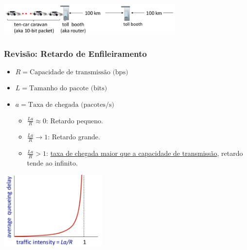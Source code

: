 \begin{itemize}[left=0.5cm, align=left, nosep]
            \begin{center}
                \includegraphics[width=0.7\textwidth]{img/cap-01/carro-pedagio.png}
            \end{center}

        \end{itemize}

    \subsubsection*{Revisão: Retardo de Enfileiramento}
        \begin{itemize}[left=0.5cm, align=left, nosep]
            \item $R = \text{Capacidade de transmissão (bps)}$ 
            \item $L = \text{Tamanho do pacote (bits)}$ 
            \item $a = \text{Taxa de chegada (pacotes/s)}$
            \begin{itemize}[left=0.5cm, nosep, label=$\hookrightarrow$]
                \item $\frac{La}{R} \approx 0$: Retardo pequeno.
                \item $\frac{La}{R} \rightarrow 1$: Retardo grande.
                \item $\frac{La}{R} > 1$: \underline{taxa de chegada maior que a capacidade de transmissão}, retardo tende ao infinito.
            \end{itemize}
        \end{itemize}
        
        \begin{center}
            \includegraphics[width=0.4\textwidth]{img/cap-01/retardo-de-enfileiramento.png}
        \end{center}

